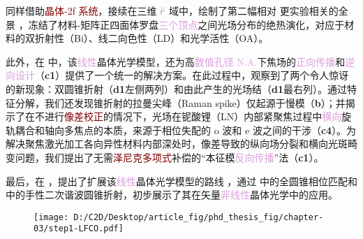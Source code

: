 同样借助\textcolor{Maroon}{晶体-2f 系统}，接续在三维 $\mathcolor{gray}{\bar{r}}$ 域中，绘制了第二幅相对  更\textcolor{NavyBlue}{实验相关}的全景 ，冻结了\textcolor{NavyBlue}{材料-矩阵正四面体罗盘}\textcolor{Plum}{三个顶点}之间光场分布的\textcolor{NavyBlue}{绝热演化}，对应于材料的\textcolor{NavyBlue}{双折射性（Bi）}、\textcolor{NavyBlue}{线二向色性（LD）}和\textcolor{NavyBlue}{光学活性（OA）}。

此外，在  中，该\textcolor{Plum}{线性}\textcolor{PineGreen}{晶体光学}模型，还为高\textcolor{Plum}{数值孔径 N.A.}下焦场的\textcolor{Plum}{正向传播}和\textcolor{Plum}{逆向设计}（\textbf{c1}）提供了一个统一的解决方案。在此过程中，观察到了两个令人惊讶的新现象：\textcolor{PineGreen}{双圆锥折射}（\textbf{d1}左侧两列）和由此产生的\textcolor{PineGreen}{光场结}（\textbf{d1}最右列）。通过\textcolor{PineGreen}{特征分解}，我们还发现\textcolor{PineGreen}{锥折射}的\textcolor{PineGreen}{拉曼尖峰}（\textcolor{PineGreen}{Raman spike}）仅起源于\textcolor{PineGreen}{慢模}（\textbf{b}）；并揭示了在不进行\textcolor{Maroon}{像差校正}的情况下，光场在铌酸锂（LN）内部\textcolor{PineGreen}{紧聚焦}过程中\textcolor{Plum}{横向}\textcolor{NavyBlue}{旋轨耦合}和轴向多焦点的本质，来源于相位失配的 \textcolor{PineGreen}{o 波}和 \textcolor{PineGreen}{e 波}之间的\textcolor{PineGreen}{干涉}（\textbf{c4}）。为解决聚焦激光加工各向异性材料内部深处时，像差导致的纵向场分裂和横向光斑畸变问题，我们提出了无需\textcolor{Maroon}{泽尼克多项式}补偿的“\textcolor{PineGreen}{本征模}\textcolor{Plum}{反向传播}”法（\textbf{c1}）。

最后，在 ，提出了扩展该\textcolor{Plum}{线性}\textcolor{PineGreen}{晶体光学}模型的路线 ，通过  中的\textcolor{PineGreen}{全圆锥相位匹配}和  中的\textcolor{NavyBlue}{手性}二次谐波\textcolor{PineGreen}{圆锥折射}，初步展示了其在矢量\textcolor{Plum}{非线性}\textcolor{PineGreen}{晶体光学}中的应用。

\begin{figure}[htbp!]
	\centering
	\texttt{[image: D:/C2D/Desktop/article\_fig/phd\_thesis\_fig/chapter-03/step1-LFCO.pdf]}
\end{figure}





